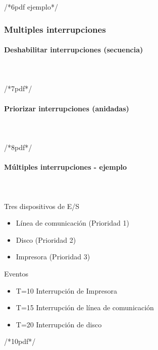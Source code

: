 /*6pdf ejemplo*/
	
\subsubsection{Multiples interrupciones}


\paragraph{Deshabilitar interrupciones (secuencia)}\mbox{}\\\\%
/*7pdf*/
\paragraph{Priorizar interrupciones (anidadas)}\mbox{}\\\\%
/*8pdf*/
	
\paragraph{Múltiples interrupciones - ejemplo}\mbox{}\\\\%
Tres dispositivos de E/S
\begin{itemize}
	\item Línea de comunicación (Prioridad 1)
	\item  Disco (Prioridad 2)
	\item Impresora (Prioridad 3)
\end{itemize}
Eventos
\begin{itemize}
	\item T=10 Interrupción de Impresora
	\item T=15 Interrupción de línea de comunicación
	\item T=20 Interrupción de disco
\end{itemize}

/*10pdf*/
